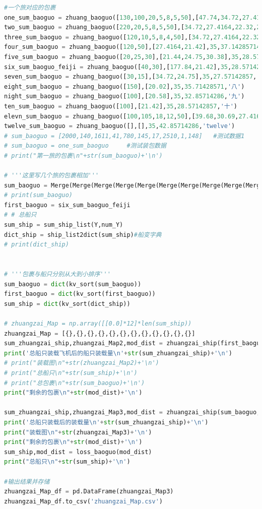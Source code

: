 \documentclass{whutmod}
\begin{document}
\begin{lstlisting}[language=python]
#一个旅对应的包裹
one_sum_baoguo = zhuang_baoguo([130,100,20,5,8,5,50],[47.74,34.72,27.4164,22.32,21.44,24.75,21.42],54,43.51851852,'一')
two_sum_baoguo = zhuang_baoguo([220,20,5,8,5,50],[34.72,27.4164,22.32,21.44,24.75,21.42],54,43.51851852,'二')
three_sum_baoguo = zhuang_baoguo([120,10,5,8,4,50],[34.72,27.4164,22.32,21.44,24.75,21.42],54,41.6666667,'三')
four_sum_baoguo = zhuang_baoguo([120,50],[27.4164,21.42],35,37.14285714,'四')
five_sum_baoguo = zhuang_baoguo([20,25,30],[21.44,24.75,30.38],35,28.5714285,'五')
six_sum_baoguo_feiji = zhuang_baoguo([40,30],[177.84,21.42],35,28.57142857,'六')#带飞机的旅，先装！！！！！！！
seven_sum_baoguo = zhuang_baoguo([30,15],[34.72,24.75],35,27.57142857,'七')
eight_sum_baoguo = zhuang_baoguo([150],[20.02],35,35.71428571,'八')
night_sum_baoguo = zhuang_baoguo([100],[20.58],35,32.85714286,'九')
ten_sum_baoguo = zhuang_baoguo([100],[21.42],35,28.57142857,'十')
elevn_sum_baoguo = zhuang_baoguo([100,105,18,12,50],[39.68,30.69,27.4164,22.32,21.42],35,71.42857143,'eleven')
twelve_sum_baoguo = zhuang_baoguo([],[],35,42.85714286,'twelve')
# sum_baoguo = [2000,140,1611,41,780,145,17,2510,1,148]   #测试数据1
# sum_baoguo = one_sum_baoguo     #测试装包数据
# print("第一旅的包裹\n"+str(sum_baoguo)+'\n')

# '''这里写几个旅的包裹相加'''
sum_baoguo = Merge(Merge(Merge(Merge(Merge(Merge(Merge(Merge(Merge(Merge(one_sum_baoguo,two_sum_baoguo),three_sum_baoguo),four_sum_baoguo),five_sum_baoguo),seven_sum_baoguo),eight_sum_baoguo),night_sum_baoguo),ten_sum_baoguo),elevn_sum_baoguo),twelve_sum_baoguo)# +.........
# print(sum_baoguo)
first_baoguo = six_sum_baoguo_feiji
# # 总船只
sum_ship = sum_ship_list(Y,num_Y)
dict_ship = ship_list2dict(sum_ship)#船变字典
# print(dict_ship)


# '''包裹与船只分别从大到小排序'''
sum_baoguo = dict(kv_sort(sum_baoguo))
first_baoguo = dict(kv_sort(first_baoguo))
sum_ship = dict(kv_sort(dict_ship))

# zhuangzai_Map = np.array([[0.0]*12]*len(sum_ship))
zhuangzai_Map = [{},{},{},{},{},{},{},{},{},{},{},{}]
sum_zhuangzai_ship,zhuangzai_Map2,mod_dist = zhuangzai_ship(first_baoguo,sum_ship,zhuangzai_Map)
print('总船只装载飞机后的船只装载量\n'+str(sum_zhuangzai_ship)+'\n')
# print("装载图\n"+str(zhuangzai_Map2)+'\n')
# print("总船只\n"+str(sum_ship)+'\n')
# print("总包裹\n"+str(sum_baoguo)+'\n')
print("剩余的包裹\n"+str(mod_dist)+'\n')

sum_zhuangzai_ship,zhuangzai_Map3,mod_dist = zhuangzai_ship(sum_baoguo,sum_zhuangzai_ship,zhuangzai_Map2)
print('总船只装载后的装载量\n'+str(sum_zhuangzai_ship)+'\n')
print("装载图\n"+str(zhuangzai_Map3)+'\n')
print("剩余的包裹\n"+str(mod_dist)+'\n')
sum_ship,mod_dist = loss_baoguo(mod_dist)
print("总船只\n"+str(sum_ship)+'\n')

#输出结果并存储
zhuangzai_Map_df = pd.DataFrame(zhuangzai_Map3)
zhuangzai_Map_df.to_csv('zhuangzai_Map.csv')
\end{lstlisting}
\end{document}
